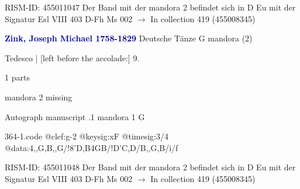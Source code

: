 \documentclass[twocolumn]{book}
\begin{document}
\newline RISM-ID: 455011047
\newline Der Band mit der mandora 2 befindet sich in D Eu mit der Signatur Esl VIII 403
\newline D-Fh  Ms 002
\newline $\rightarrow$ In collection 419 (455008345)

\newline \par \vspace{7pt} \textcolor{darkblue}{\textbf{Zink, Joseph Michael  1758-1829}}
\newline Deutsche Tänze  G  
\newline mandora (2)
\newline \begin{itshape}[f.9r, at left:] Tedesco | [left before the accolade:] 9.\end{itshape} 
\newline \textcolor{darkblue}{}  1 parts  
\newline \begin{small} mandora 2 missing\end{small} 
\newline Autograph manuscript
.1  mandora 1  G  
\begin{filecontents*}{364-1.code}
@clef:g-2
@keysig:xF
@timesig:3/4
@data:4,,G,B,,G/!8'D,B4GB/!D'C,D/B,,G,B/i/f
\end{filecontents*}
\newline
%

\newline RISM-ID: 455011048
\newline Der Band mit der mandora 2 befindet sich in D Eu mit der Signatur Esl VIII 403
\newline D-Fh  Ms 002
\newline $\rightarrow$ In collection 419 (455008345)
\end{document}
